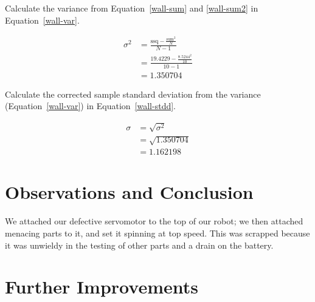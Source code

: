 \documentclass[twocolumn]{article}
\begin{document}
Calculate the variance from Equation~\ref{wall-sum} and \ref{wall-sum2} in Equation~\ref{wall-var}.

\begin{align}
\sigma^{2} &= \frac{\text{ssq} - \frac{\text{sum}^{2}}{N}}{N-1} \nonumber\\
 &= \frac{19.4229 - \frac{8.5244^2}{10}}{10-1} \nonumber\\
 &= 1.350704 \label{wall-var}
\end{align}

Calculate the corrected sample standard deviation from the variance (Equation~\ref{wall-var}) in Equation~\ref{wall-stdd}.

\begin{align}
\sigma &= \sqrt{\sigma^{2}} \nonumber\\
 &= \sqrt{1.350704} \nonumber\\
 &= 1.162198 \label{wall-stdd}
\end{align}

\section{Observations and Conclusion}

We attached our defective servomotor to the top of our robot; we then attached menacing parts to it, and set it spinning at top speed. This was scrapped because it was unwieldy in the testing of other parts and a drain on the battery.

\section{Further Improvements}


\end{document}
